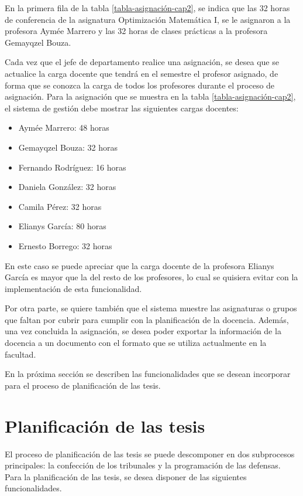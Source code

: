 En la primera fila de la tabla \ref{tabla-asignación-cap2}, se indica 
que las 32 horas de conferencia de la asignatura Optimización Matemática I,
se le asignaron a la profesora Aymée Marrero y las 32 horas de clases prácticas a la profesora Gemayqzel Bouza.

Cada vez que el jefe de departamento realice una 
asignación, se desea que se actualice la carga docente que tendrá en el semestre el profesor asignado, de forma que se conozca la carga 
de todos los profesores durante el proceso de asignación.
Para la asignación que se muestra en la tabla \ref{tabla-asignación-cap2}, 
el sistema de gestión debe mostrar las siguientes cargas docentes:

\begin{multicols}{2}
    \begin{itemize}
        \item Aymée Marrero: 48 horas
        \item Gemayqzel Bouza: 32 horas 
        \item Fernando Rodríguez: 16 horas 
        \item Daniela González: 32 horas 
        \item Camila Pérez: 32 horas
        \item Elianys García: 80 horas
        \item Ernesto Borrego: 32 horas 
    \end{itemize}
\end{multicols}

En este caso se puede apreciar que la carga docente de la profesora 
Elianys García es mayor que la del resto de los profesores, lo cual se 
quisiera evitar con la implementación de esta funcionalidad. 


Por otra parte, se quiere también que el sistema muestre las asignaturas o 
grupos que faltan por cubrir para cumplir con la planificación de la docencia. 
Además, una vez concluida la asignación, se desea poder exportar la información de la docencia a un documento con el 
formato que se utiliza actualmente en la facultad. 


En la próxima sección se describen las funcionalidades que se desean incorporar para el 
proceso de planificación de las tesis.


\section{Planificación de las tesis}\label{tesis:cap2}
El proceso de planificación de las tesis se puede descomponer en dos subprocesos principales: 
la confección de los tribunales y la programación de las defensas.
Para la planificación de las tesis, se desea disponer de las siguientes funcionalidades.



